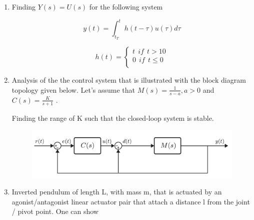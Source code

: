 \begin{enumerate}
	
	
		 
	\item Finding $ Y (s)=U(s) $ for the following system
	
	$$ y(t) = \int_{t_T}^{t} h(t-\tau) u(\tau) d\tau $$
	
	\[   
		h(t) = 
     		\begin{cases}
     			t ~~ if ~~ t > 10 \\
     			0 ~~ if ~~ t \leq 0\\
     		\end{cases}
	\]

	\item Analysis of the the control system that is illustrated with the block diagram topology given below. Let's assume that $M(s) = \frac{1}{s-a} , a > 0 $  and $ C(s) = \frac{K}{s+1} $ .
	
	Finding the range of K such that the closed-loop system is stable.
		
	\begin{figure}[H]
		\center
		\setlength{\unitlength}{\textwidth} 
		\includegraphics[width=0.6\unitlength]{4}
	\end{figure}
	
	
	\item Inverted pendulum of length L, with mass m, that is actuated by an agonist/antagonist linear actuator pair that attach a distance l from the joint / pivot point. One can show
	

\end{enumerate}
